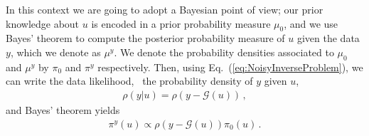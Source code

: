 In this context we are going to adopt a Bayesian point of view; our
prior knowledge about $u$ is encoded in a prior probability measure
$\mu_0$, and we use Bayes' theorem to compute the posterior
probability measure of $u$ given the data $y$, which we denote as
$\mu^y$. We denote the probability densities associated to $\mu_0$ and
$\mu^y$ by $\pi_0$ and $\pi^y$ respectively. Then, using
Eq.~(\ref{eq:NoisyInverseProblem}), we can write the data likelihood,
\ie\ the probability density of $y$ given $u$,
\begin{align}
  \label{eq:YGivenUProbDensity}
  \rho(y|u) = \rho(y-\mathcal G(u))\, ,
\end{align}
and Bayes' theorem yields
\begin{align}
  \label{eq:BayesThmInversePosterior}
  \pi^y(u) \propto \rho(y-\mathcal G(u)) \pi_0(u)\, .
\end{align}

